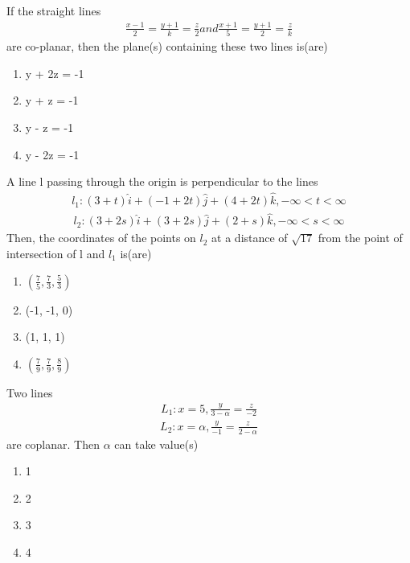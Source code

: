 \item If the straight lines 
\begin{align*}
\frac{x-1}{2} = \frac{y+1}{k} = \frac{z}{2} and \frac{x+1}{5} = \frac{y+1}{2} = \frac{z}{k}
\end{align*}
are co-planar, then the plane(s) containing these two lines is(are)
\begin{enumerate}
\item y + 2z = -1
\item y + z = -1
\item y - z = -1
\item y - 2z = -1
\end{enumerate}

\item A line l passing through the origin is perpendicular to the lines
\begin{align*}
l_1: (3 + t)\hat{i} + (-1 + 2t)\hat{j} + (4 + 2t)\hat{k}, -\infty < t < \infty
\end{align*}
\begin{align*}
l_2: (3 + 2s)\hat{i} + (3 + 2s)\hat{j} + (2 + s)\hat{k}, -\infty < s < \infty
\end{align*}
Then, the coordinates of the points on $l_2$ at a distance of $\sqrt{17}$ from the point of intersection of l and $l_1$ is(are)
\begin{enumerate}
\item $(\frac{7}{5}, \frac{7}{3}, \frac{5}{3})$
\item (-1, -1, 0)
\item (1, 1, 1)
\item $(\frac{7}{9}, \frac{7}{9}, \frac{8}{9})$
\end{enumerate}

\item Two lines
\begin{align*}
L_1: x = 5, \frac{y}{3 - \alpha} = \frac{z}{-2}
\end{align*}
\begin{align*}
L_2: x = \alpha, \frac{y}{-1} = \frac{z}{2-\alpha}
\end{align*}
are coplanar. Then $\alpha$ can take value(s)
\begin{enumerate}
\item 1
\item 2
\item 3
\item 4
\end{enumerate}

